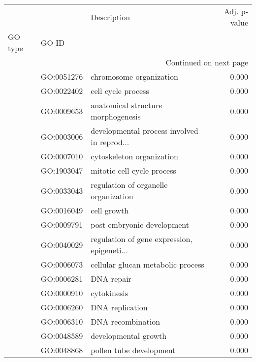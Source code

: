 \begin{longtable}{lllr}
\toprule
   &            &                                  Description &  Adj. p-value \\
GO type & GO ID &                                              &               \\
\midrule
\endhead
\midrule
\multicolumn{4}{r}{{Continued on next page}} \\
\midrule
\endfoot

\bottomrule
\endlastfoot
\multirow{313}{*}{BP} & GO:0051276 &                      chromosome organization &         0.000 \\
   & GO:0022402 &                           cell cycle process &         0.000 \\
   & GO:0009653 &           anatomical structure morphogenesis &         0.000 \\
   & GO:0003006 &  developmental process involved in reprod... &         0.000 \\
   & GO:0007010 &                    cytoskeleton organization &         0.000 \\
   & GO:1903047 &                   mitotic cell cycle process &         0.000 \\
   & GO:0033043 &         regulation of organelle organization &         0.000 \\
   & GO:0016049 &                                  cell growth &         0.000 \\
   & GO:0009791 &                   post-embryonic development &         0.000 \\
   & GO:0040029 &  regulation of gene expression, epigeneti... &         0.000 \\
   & GO:0006073 &            cellular glucan metabolic process &         0.000 \\
   & GO:0006281 &                                   DNA repair &         0.000 \\
   & GO:0000910 &                                  cytokinesis &         0.000 \\
   & GO:0006260 &                              DNA replication &         0.000 \\
   & GO:0006310 &                            DNA recombination &         0.000 \\
   & GO:0048589 &                         developmental growth &         0.000 \\
   & GO:0048868 &                      pollen tube development &         0.000 \\

\end{longtable}
